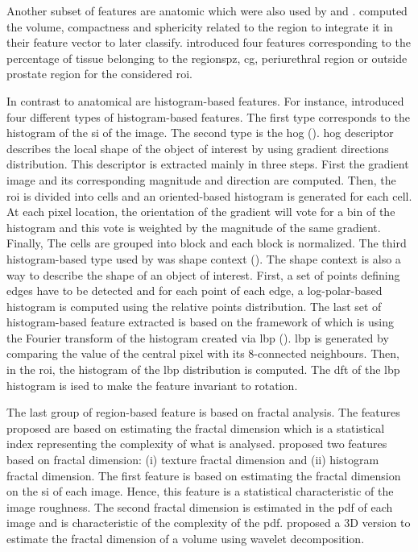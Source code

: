 \begin{enumerate}[leftmargin=*]
Another subset of features are anatomic which were also used by \cite{Litjens2012} and \cite{Matulewicz2013}. \cite{Litjens2012} computed the volume, compactness and sphericity related to the region to integrate it in their feature vector to later classify. \cite{Matulewicz2013} introduced four features corresponding to the percentage of tissue belonging to the regions\ac{pz}, \ac{cg}, periurethral region or outside prostate region for the considered \ac{roi}.

In contrast to anatomical are histogram-based features. For instance, \cite{Liu2013} introduced four different types of histogram-based features. The first type corresponds to the histogram of the \ac{si} of the image. The second type is the \acf{hog} (\cite{Dalal2005}). \Ac{hog} descriptor describes the local shape of the object of interest by using gradient directions distribution. This descriptor is extracted mainly in three steps. First the gradient image and its corresponding magnitude and direction are computed. Then, the \ac{roi} is divided into cells and an oriented-based histogram is generated for each cell. At each pixel location, the orientation of the gradient will vote for a bin of the histogram and this vote is weighted by the magnitude of the same gradient. Finally, The cells are grouped into block and each block is normalized. The third histogram-based type used by \cite{Liu2013} was shape context (\cite{Belongie2002}). The shape context is also a way to describe the shape of an object of interest. First, a set of points defining edges have to be detected and for each point of each edge, a log-polar-based histogram is computed using the relative points distribution. The last set of histogram-based feature extracted is based on the framework of \cite{Zhao2012} which is using the Fourier transform of the histogram created via \acf{lbp} (\cite{Ojala1996}). \Ac{lbp} is generated by comparing the value of the central pixel with its 8-connected neighbours. Then, in the \ac{roi}, the histogram of the \ac{lbp} distribution is computed. The \acf{dft} of the \ac{lbp} histogram is ised to make the feature invariant to rotation.

The last group of region-based feature is based on fractal analysis. The features proposed are based on estimating the fractal dimension which is a statistical index representing the complexity of what is analysed. \cite{Lv2009} proposed two features based on fractal dimension: (i) texture fractal dimension and (ii) histogram fractal dimension. The first feature is based on estimating the fractal dimension on the \ac{si} of each image. Hence, this feature is a statistical characteristic of the image roughness. The second fractal dimension is estimated in the \ac{pdf} of each image and is characteristic of the complexity of the \ac{pdf}. \cite{Lopes2011} proposed a 3D version to estimate the fractal dimension of a volume using wavelet decomposition.
\end{enumerate}

